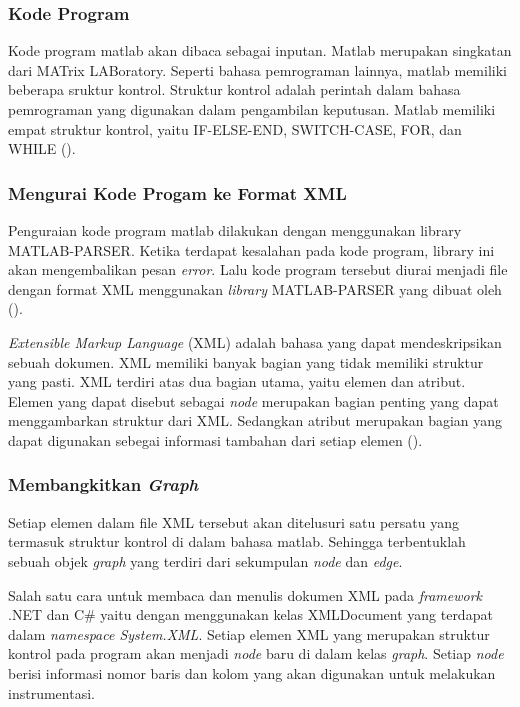 \subsubsection*{Kode Program}
Kode program matlab akan dibaca sebagai inputan. Matlab merupakan singkatan dari MATrix LABoratory. Seperti bahasa pemrograman lainnya, matlab memiliki beberapa sruktur kontrol. Struktur kontrol adalah perintah dalam bahasa pemrograman yang digunakan dalam pengambilan keputusan. Matlab memiliki empat struktur kontrol, yaitu IF-ELSE-END, SWITCH-CASE, FOR, dan WHILE (\cite{HOUCQUE2005}). 

\subsubsection*{Mengurai Kode Progam ke Format XML}
Penguraian kode program matlab dilakukan dengan menggunakan library  MATLAB-PARSER. Ketika terdapat kesalahan pada kode program, library  ini akan mengembalikan pesan \textit{error}. Lalu kode program tersebut diurai menjadi file dengan format XML menggunakan \textit{library} MATLAB-PARSER yang dibuat oleh  \citeauthor{SUFFOSPARSER2005} (\cite*{SUFFOSPARSER2005}). 

\textit{Extensible Markup Language} (XML) adalah bahasa yang dapat mendeskripsikan sebuah dokumen. XML memiliki banyak bagian yang tidak memiliki struktur yang pasti. XML terdiri atas dua bagian utama, yaitu elemen dan atribut. Elemen yang dapat disebut sebagai \textit{node} merupakan bagian penting yang dapat menggambarkan struktur dari XML. Sedangkan atribut merupakan bagian yang dapat digunakan sebegai informasi tambahan dari setiap elemen  (\cite{HARTWELL2017}). 

\subsubsection*{Membangkitkan \textit{Graph}}
Setiap elemen dalam file XML tersebut akan ditelusuri satu persatu yang termasuk struktur kontrol di dalam bahasa matlab. Sehingga terbentuklah sebuah objek \textit{graph} yang terdiri dari sekumpulan \textit{node} dan \textit{edge}. 

Salah satu cara untuk membaca dan menulis dokumen XML pada \textit{framework} .NET dan C\# yaitu dengan menggunakan kelas XMLDocument yang terdapat dalam\textit{ namespace System.XML}. Setiap elemen XML yang merupakan struktur kontrol pada program akan menjadi \textit{node} baru di dalam kelas \textit{graph}. Setiap \textit{node} berisi informasi nomor baris dan kolom yang akan digunakan untuk melakukan instrumentasi.

